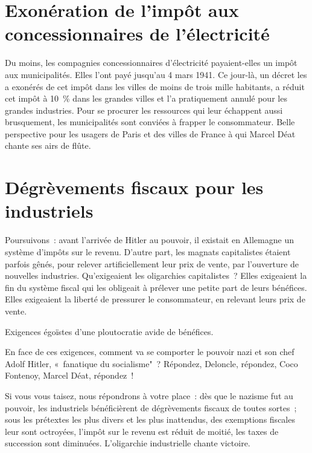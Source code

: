 \documentclass[french,twoside]{book} %
\begin{document}
\section[Exonération de l’impôt aux concessionnaires de l’électricité]{Exonération de l’impôt aux concessionnaires de l’électricité}
\noindent Du moins, les compagnies concessionnaires d’électricité payaient-elles un impôt aux municipalités. Elles l’ont payé jusqu’au 4 mars 1941. Ce jour-là, un décret les a exonérés de cet impôt dans les villes de moins de trois mille habitants, a réduit cet impôt à 10 \% dans les grandes villes et l’a pratiquement annulé pour les grandes industries. Pour se procurer les ressources qui leur échappent aussi brusquement, les municipalités sont conviées à frapper le consommateur. Belle perspective pour les usagers de Paris et des villes de France à qui Marcel Déat chante ses airs de flûte.
\section[Dégrèvements fiscaux pour les industriels]{Dégrèvements fiscaux pour les industriels}
\noindent Poursuivons : avant l’arrivée de Hitler au pouvoir, il existait en Allemagne un système d’impôts sur le revenu. D’autre part, les magnats capitalistes étaient parfois gênés, pour relever artificiellement leur prix de vente, par l’ouverture de nouvelles industries. Qu’exigeaient les oligarchies capitalistes ? Elles exigeaient la fin du système fiscal qui les obligeait à prélever une petite part de leurs bénéfices. Elles exigeaient la liberté de pressurer le consommateur, en relevant leurs prix de vente.\par
Exigences égoïstes d’une ploutocratie avide de bénéfices.\par
En face de ces exigences, comment va se comporter le pouvoir nazi et son chef Adolf Hitler, « fanatique du socialisme" ? Répondez, Deloncle, répondez, Coco Fontenoy, Marcel Déat, répondez !\par
Si vous vous taisez, nous répondrons à votre place : dès que le nazisme fut au pouvoir, les industriels bénéficièrent de dégrèvements fiscaux de toutes sortes ; sous les prétextes les plus divers et les plus inattendus, des exemptions fiscales leur sont octroyées, l’impôt sur le revenu est réduit de moitié, les taxes de succession sont diminuées. L’oligarchie industrielle chante victoire.
\end{document}
